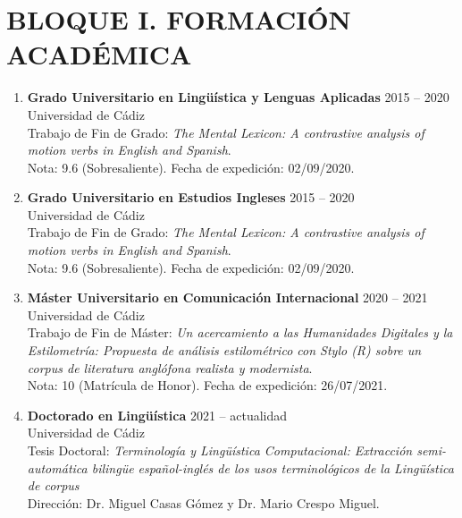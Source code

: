 \section*{BLOQUE I. FORMACIÓN ACADÉMICA}
{}


\begin{enumerate}

    \item 
  \textbf{Grado Universitario en Lingüística y Lenguas Aplicadas} \hfill 2015 – 2020\\
  Universidad de Cádiz\\
  Trabajo de Fin de Grado: \textit{The Mental Lexicon: A contrastive analysis of motion verbs in English and Spanish}.\\
  Nota: 9.6 (Sobresaliente).
  Fecha de expedición: 02/09/2020.

  \item 
  \textbf{Grado Universitario en Estudios Ingleses} \hfill 2015 – 2020\\
  Universidad de Cádiz\\
  Trabajo de Fin de Grado: \textit{The Mental Lexicon: A contrastive analysis of motion verbs in English and Spanish}.\\
  Nota: 9.6 (Sobresaliente). Fecha de expedición: 02/09/2020.

  \item 
  \textbf{Máster Universitario en Comunicación Internacional} \hfill 2020 – 2021\\
  Universidad de Cádiz\\
  Trabajo de Fin de Máster: \textit{Un acercamiento a las Humanidades Digitales y la Estilometría: Propuesta de análisis estilométrico con Stylo (R) sobre un corpus de literatura anglófona realista y modernista}.\\
  Nota: 10 (Matrícula de Honor). Fecha de expedición: 26/07/2021.

  \item 
  \textbf{Doctorado en Lingüística} \hfill 2021 – actualidad\\
  Universidad de Cádiz\\
  Tesis Doctoral: \textit{Terminología y Lingüística Computacional: Extracción semi-automática bilingüe español-inglés de los usos terminológicos de la Lingüística de corpus}\\
  Dirección: Dr. Miguel Casas Gómez y Dr. Mario Crespo Miguel.


\end{enumerate}
